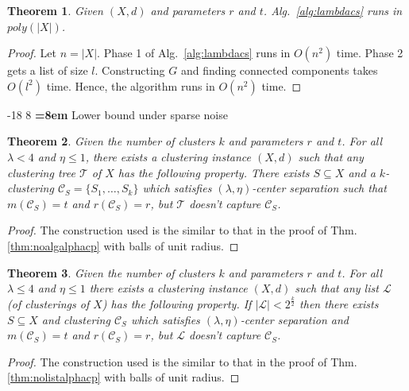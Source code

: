 \documentclass[12pt]{article}
\makeatletter
\newtheorem{theorem}{Theorem}
\newcommand{\mc}{\mathcal}
\renewcommand\subsubsection{\@startsection{subsubsection}{3}{\z@}%
   {-18\p@ \@plus -4\p@ \@minus -4\p@}%
   {8\p@ \@plus 4\p@ \@minus 4\p@}%
   {\normalfont\normalsize\bfseries\boldmath
   \rightskip=\z@ \@plus 8em \pretolerance=10000}}
\makeatother
\begin{document}
\begin{theorem}
\label{thm:alglambdacstime}
Given $(X, d)$ and parameters $r$ and $t$. Alg.~\ref{alg:lambdacs} runs in $poly(|X|)$.
\end{theorem}

\begin{proof}
Let $n = |X|$. Phase 1 of Alg.~\ref{alg:lambdacs} runs in $O(n^2)$ time. Phase 2 gets a list of size $l$. Constructing $G$ and finding connected components takes $O(l^2)$ time. Hence, the algorithm runs in $O(n^2)$ time.
\end{proof}


\subsubsection{Lower bound under sparse noise}
\label{section:lambdaLowerBoundSparse}

\begin{theorem}
\label{thm:noalglambdacs}
Given the number of clusters $k$ and parameters $r$ and $t$. For all $\lambda < 4$ and $\eta \le 1$, there exists a clustering instance $(X , d)$ such that any clustering tree $\mc T$ of $X$ has the following property. There exists $S \subseteq X$ and a $k$-clustering $\mc C_{S} = \{S_1, \ldots, S_k\}$ which satisfies $(\lambda, \eta)$-center separation such that $m(\mc C_{S}) = t$ and $r(\mc C_{S}) = r$, but $\mc T$ doesn't capture $\mc C_{S}$.
\end{theorem}
\begin{proof}
The construction used is the similar to that in the proof of Thm. \ref{thm:noalgalphacp} with balls of unit radius.
\end{proof}

\begin{theorem}
\label{thm:nolistlambdacs}
Given the number of clusters $k$ and parameters $r$ and $t$. For all $\lambda \le 4$ and $\eta \le 1$ there exists a clustering instance $(X, d)$ such that any list $\mc L$ (of clusterings of $X$) has  the following property. If $|\mc L| < 2^{\frac{k}{2}}$ then there exists $S \subseteq X$ and clustering $\mc C_{S}$ which satisfies $(\lambda, \eta)$-center separation and $ m(\mc C_{S}) = t$ and $r(\mc C_{S}) = r$, but $\mc L$ doesn't capture $\mc C_{S}$.
\end{theorem}
\begin{proof}
The construction used is the similar to that in the proof of Thm.  \ref{thm:nolistalphacp} with balls of unit radius.
\end{proof}
\end{document}
